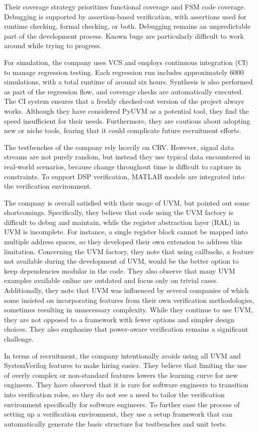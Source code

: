 Their coverage strategy prioritizes functional coverage and FSM code coverage. Debugging is supported by
assertion-based verification, with assertions used for runtime checking, formal checking, or both. Debugging remains
an unpredictable part of the development process. Known bugs are particularly difficult to work around while trying to progress.

For simulation, the company uses VCS and employs continuous integration (CI) to manage regression testing. Each
regression run includes approximately 6000 simulations, with a total runtime of around six hours. Synthesis is also
performed as part of the regression flow, and coverage checks are automatically executed. The CI system ensures that
a freshly checked-out version of the project always works. Although they have considered PyUVM as a potential tool,
they find the speed insufficient for their needs. Furthermore, they are cautious about adopting new or niche tools,
fearing that it could complicate future recruitment efforts.

The testbenches of the company rely heavily on CRV. However, signal data streams are not purely random, but instead
they use typical data encountered in real-world scenarios, because change throughout time is difficult to capture in
constraints. To support DSP verification, MATLAB models are integrated into the verification environment.

The company is overall satisfied with their usage of UVM, but pointed out some shortcomings. Specifically, they
believe that code using the UVM factory is difficult to debug and maintain, while the register abstraction layer
(RAL) in UVM is incomplete. For instance, a single register block cannot be mapped into multiple address spaces, so
they developed their own extension to address this limitation. Concerning the UVM factory, they note that using
callbacks, a feature not available during the development of UVM, would be the better option to keep dependencies
modular in the code. They also observe that many UVM examples available online are outdated and focus only on trivial
cases. Additionally, they note that UVM was influenced by several companies of which some insisted on incorporating
features from their own verification methodologies, sometimes resulting in unnecessary complexity. While they
continue to use UVM, they are not opposed to a framework with fewer options and simpler design choices. They
also emphasize that power-aware verification remains a significant challenge.

In terms of recruitment, the company intentionally avoids using all UVM and SystemVerilog features to make hiring
easier. They believe that limiting the use of overly complex or non-standard features lowers the learning curve for
new engineers. They have observed that it is rare for software engineers to transition into verification roles, so
they do not see a need to tailor the verification environment specifically for software engineers. To further ease
the process of setting up a verification environment, they use a setup framework that can automatically generate the
basic structure for testbenches and unit tests.

